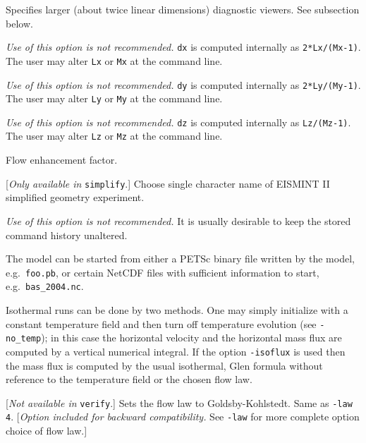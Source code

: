 \documentclass[final]{amsart}
\begin{document}
  Specifies larger (about twice linear dimensions) diagnostic viewers.  See subsection below.

  \emph{Use of this option is not recommended.}  \verb|dx| is computed internally as \verb|2*Lx/(Mx-1)|.  The user may alter \verb|Lx| or \verb|Mx| at the command line.

  \emph{Use of this option is not recommended.}  \verb|dy| is computed internally as \verb|2*Ly/(My-1)|.  The user may alter \verb|Ly| or \verb|My| at the command line.

  \emph{Use of this option is not recommended.}  \verb|dz| is computed internally as \verb|Lz/(Mz-1)|.  The user may alter \verb|Lz| or \verb|Mz| at the command line.

  Flow enhancement factor.

  [\emph{Only available in } \verb|simplify|.]  Choose single character name of EISMINT II \cite{EISMINT00} simplified geometry experiment.

  \emph{Use of this option is not recommended.}  It is usually desirable to keep the stored command history unaltered.


  The model can be started from either a PETSc binary file written by the model, e.g.~\verb|foo.pb|, or certain NetCDF files with sufficient information to start, e.g.~\verb|bas_2004.nc|.

  Isothermal runs can be done by two methods.  One may simply initialize with a constant temperature field and then turn off temperature evolution (see \verb|-no_temp|); in this case the horizontal velocity and the horizontal mass flux are computed by a vertical numerical integral.  If the option \verb|-isoflux| is used then the mass flux is computed by the usual isothermal, Glen formula without reference to the temperature field or the chosen flow law.

  [\emph{Not available in } \verb|verify|.]  Sets the flow law to Goldsby-Kohlstedt.  Same as \verb|-law 4|.  [\emph{Option included for backward compatibility.}  See \verb|-law| for more complete option choice of flow law.]


\end{document}
